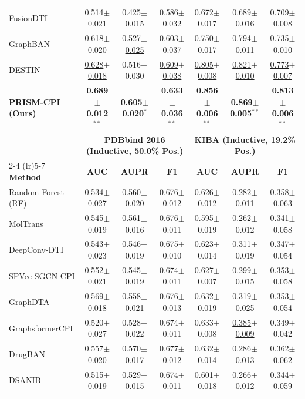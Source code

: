 \begin{table}[H]
{{\begin{tabular}{l ccc ccc}
FusionDTI & 0.514${\pm}$0.021 & 0.425${\pm}$0.015 & 0.586${\pm}$0.032 & 0.672${\pm}$0.017 & 0.689${\pm}$0.016 & 0.709${\pm}$0.008 \\
GraphBAN & 0.618${\pm}$0.020 & \underline{0.527${\pm}$0.025} & 0.603${\pm}$0.037 & 0.750${\pm}$0.017 & 0.794${\pm}$0.011 & 0.735${\pm}$0.010 \\
DESTIN & \underline{0.628${\pm}$0.018} & 0.516${\pm}$0.030 & \underline{0.609${\pm}$0.038} & \underline{0.805${\pm}$0.008} & \underline{0.821${\pm}$0.010} & \underline{0.773${\pm}$0.007} \\
\midrule
\textbf{PRISM-CPI (Ours)} & \textbf{0.689${\pm}$0.012}$^{**}$ & \textbf{0.605${\pm}$0.020}$^{*}$ & \textbf{0.633${\pm}$0.036}$^{**}$ & \textbf{0.856${\pm}$0.006}$^{**}$ & \textbf{0.869${\pm}$0.005}$^{**}$ & \textbf{0.813${\pm}$0.006}$^{**}$ \\
\midrule
 & \multicolumn{3}{c}{\textbf{PDBbind 2016 (Inductive, 50.0\% Pos.)}} & \multicolumn{3}{c}{\textbf{KIBA (Inductive, 19.2\% Pos.)}} \\
\cmidrule(lr){2-4} \cmidrule(lr){5-7}
\textbf{Method} & \textbf{AUC} & \textbf{AUPR} & \textbf{F1} & \textbf{AUC} & \textbf{AUPR} & \textbf{F1} \\
\midrule
Random Forest (RF) & 0.534${\pm}$0.027 & 0.560${\pm}$0.020 & 0.676${\pm}$0.012 & 0.626${\pm}$0.012 & 0.282${\pm}$0.011 & 0.358${\pm}$0.063 \\
MolTrans & 0.545${\pm}$0.019 & 0.561${\pm}$0.016 & 0.676${\pm}$0.011 & 0.595${\pm}$0.019 & 0.262${\pm}$0.012 & 0.341${\pm}$0.058 \\
DeepConv-DTI & 0.543${\pm}$0.023 & 0.546${\pm}$0.019 & 0.675${\pm}$0.010 & 0.623${\pm}$0.014 & 0.311${\pm}$0.019 & 0.347${\pm}$0.054 \\
SPVec-SGCN-CPI & 0.552${\pm}$0.021 & 0.545${\pm}$0.019 & 0.674${\pm}$0.011 & 0.627${\pm}$0.007 & 0.299${\pm}$0.015 & 0.353${\pm}$0.058 \\
GraphDTA & 0.569${\pm}$0.018 & 0.558${\pm}$0.021 & 0.676${\pm}$0.013 & 0.632${\pm}$0.019 & 0.319${\pm}$0.025 & 0.353${\pm}$0.054 \\
GraphsformerCPI & 0.520${\pm}$0.027 & 0.528${\pm}$0.022 & 0.674${\pm}$0.011 & 0.633${\pm}$0.008 & \underline{0.385${\pm}$0.009} & 0.349${\pm}$0.042 \\
DrugBAN & 0.557${\pm}$0.020 & 0.570${\pm}$0.017 & 0.677${\pm}$0.012 & 0.632${\pm}$0.014 & 0.286${\pm}$0.013 & 0.362${\pm}$0.062 \\
DSANIB & 0.515${\pm}$0.019 & 0.529${\pm}$0.015 & 0.674${\pm}$0.011 & 0.601${\pm}$0.018 & 0.266${\pm}$0.012 & 0.344${\pm}$0.059 \\

\end{tabular}}}
\end{table}
